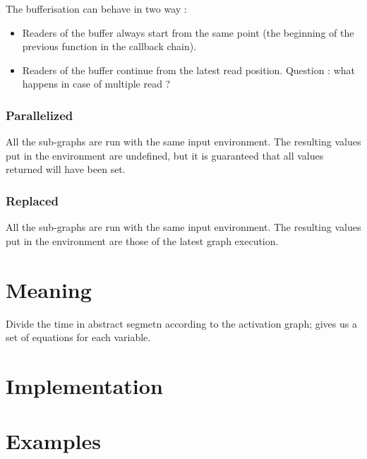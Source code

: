 \documentclass[a4paper,twocolumns]{article}
\begin{document}
	The bufferisation can behave in two way :
	\begin{itemize}
		\item Readers of the buffer always start from the same point (the beginning of the previous function in the callback chain).
		\item Readers of the buffer continue from the latest read position.
		Question : what happens in case of multiple read ?
	\end{itemize}
	
	
	\subsubsection{Parallelized}
	All the sub-graphs are run with the same input environment. 
	The resulting values put in the environment are undefined, but it is guaranteed that all values returned will have been set.
	
	\subsubsection{Replaced}
	All the sub-graphs are run with the same input environment. 
	The resulting values put in the environment are those of the latest graph execution.
	
	\section{Meaning}
	Divide the time in abstract segmetn according to the activation graph; gives us a set of equations for each variable.
	\section{Implementation}
	\section{Examples}
\end{document}
